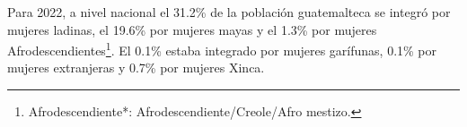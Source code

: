Para 2022, a nivel nacional el 31.2\% de la población guatemalteca se integró por mujeres ladinas, el 19.6\% por mujeres mayas y el 1.3\% por mujeres Afrodescendientes\footnote{Afrodescendiente*: Afrodescendiente/Creole/Afro mestizo.}. El 0.1\% estaba integrado por mujeres garífunas, 0.1\% por mujeres extranjeras y 0.7\% por mujeres Xinca.